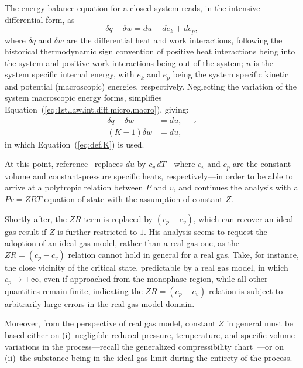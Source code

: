 \documentclass[fleqn,11pt]{SelfArx}
\begin{document}
    The energy balance equation for a closed system reads, in the intensive  differential  form,
    as
    \begin{equation}
        \delta q - \delta w = du + de_k + de_p,
        \label{eq:1st.law.int.diff.micro.macro}
    \end{equation}
    \noindent where $\delta q$ and $\delta w$ are the differential heat and  work  interactions,
    following the historical thermodynamic sign convention of positive heat  interactions  being
    into the system and positive work interactions being out of the system; $u$  is  the  system
    specific internal energy, with $e_k$  and  $e_p$  being  the  system  specific  kinetic  and
    potential (macroscopic) energies, respectively.  Neglecting  the  variation  of  the  system
    macroscopic  energy  forms,   simplifies   Equation~(\ref{eq:1st.law.int.diff.micro.macro}),
    giving:
    \begin{align}
        \delta q - \delta w & = du, & \rightharpoondown
        \label{eq:1st.law.int.diff} \\
        (K-1)\delta w & = du,
        \label{eq:1st.law.int.diff.K}
    \end{align}
    \noindent in which Equation~(\ref{eq:def.K}) is used.

    At  this   point,   reference~\cite{2012-ChristiansJ-IntJMechEngEduc}   replaces   $du$   by
    $c_v\,dT$---where $c_v$ and $c_p$ are the  constant-volume  and  constant-pressure  specific
    heats, respectively---in order to be able to arrive at a polytropic relation between $P$ and
    $v$, and continues the analysis with a $Pv = ZRT$ equation of state with the  assumption  of
    constant $Z$.

    Shortly after, the $ZR$ term is replaced by $(c_p - c_v)$, which can recover  an  ideal  gas
    result if $Z$ is further restricted to $1$. His analysis seems to request the adoption of an
    ideal gas model, rather than a real gas one, as the $ZR = (c_p - c_v)$ relation cannot  hold
    in general for a real gas. Take, for instance, the close vicinity  of  the  critical  state,
    predictable by a real gas model, in which $c_p \to +\infty$, even  if  approached  from  the
    monophase region, while all other quantities remain finite, indicating  the  $ZR  =  (c_p  -
    c_v)$ relation is subject to arbitrarily large errors in the real gas model domain.

    Moreover, from the perspective of real gas model, constant $Z$  in  general  must  be  based
    either on (i)~negligible reduced pressure, temperature, and specific  volume  variations  in
    the           process---recall           the           generalized           compressibility
    chart~\cite{2013-CengelYA+BolesMA-AMGH}---or on (ii)~the substance being in  the  ideal  gas
    limit during the entirety of the process.
\end{document}
